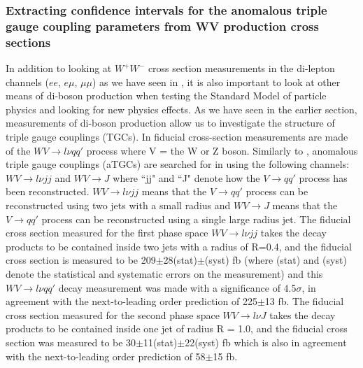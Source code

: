 \documentclass[11pt,oneside,a4paper]{article}
\begin{document}
\subsubsection{Extracting confidence intervals for the anomalous triple gauge coupling parameters from WV production cross sections}

In addition to looking at $W^{+}W^{-}$ cross section measurements in the di-lepton channels ($ee$, $e\mu$, $\mu\mu$) as we have seen in \cite{WWtgc}, it is also important to look at other means of di-boson production when testing the Standard Model of particle physics and looking for new physics effects. As we have seen in the earlier section, measurements of di-boson production allow us to investigate the structure of triple gauge couplings (TGCs). In \cite{WV} fiducial cross-section measurements are made of the $WV \rightarrow l\nu qq'$ process where V = the W or Z boson. Similarly to \cite{WWtgc}, anomalous triple gauge couplings (aTGCs) are searched for in \cite{WV} using the following channels: $WV \rightarrow l\nu jj$ and $WV \rightarrow J$ where ``jj" and ``J" denote how the $V \rightarrow qq'$ process has been reconstructed. $WV \rightarrow l\nu jj$ means that the  $V \rightarrow qq'$ process can be reconstructed using two jets with a small radius and $WV \rightarrow J$ means that the  $V \rightarrow qq'$ process can be reconstructed using a single large radius jet. The fiducial cross section measured for the first phase space $WV \rightarrow l\nu jj$ takes the decay products to be contained inside two jets with a radius of R=0.4, and the fiducial cross section is measured to be 209$\pm$28(stat)$\pm$(syst) fb (where (stat) and (syst) denote the statistical and systematic errors on the measurement) and this $WV \rightarrow l\nu qq'$ decay measurement was made with a significance of 4.5$\sigma$, in agreement with the next-to-leading order prediction of 225$\pm$13 fb. The fiducial cross section measured for the second phase space $WV \rightarrow l\nu J$ takes the decay products to be contained inside one jet of radius R = 1.0, and the fiducial cross section was measured to be 30$\pm$11(stat)$\pm$22(syst) fb which is also in agreement with the next-to-leading order prediction of 58$\pm$15 fb. \cite{WV}
\end{document}
